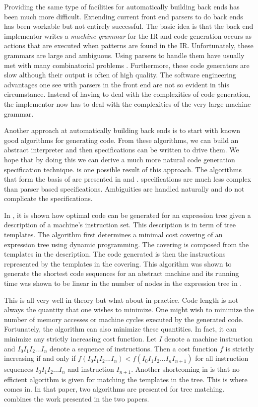 Providing the same type of facilities for automatically building back
ends has been much more difficult.  Extending current front end
parsers to do back ends
has been workable but not entirely successful.  The basic idea is that
the back end implementor writes a {\it machine grammar}
for the IR and code generation
occurs as actions that are executed when patterns are found
in the IR\cite{gana,henry}.
Unfortunately, these grammars are large and ambiguous.  Using
parsers to handle them have usually met with many combinatorial problems
\cite{henry}.  Furthermore, these code generators are slow
although their output is often of high quality.
The software engineering advantages one see with parsers in the front end
are not so evident in this circumstance.  Instead of having to deal with
the complexities of code generation, the implementor now has to deal with
the complexities of the very large machine grammar.

Another approach at automatically building back ends is to start with
known good algorithms for generating code.  From these algorithms, we
can build an abstract interpreter and then specifications can be written
to drive them.  We hope that by doing this we can derive a much more natural
code generation specification technique.
\Twiglang{} is one possible result of this approach.  The algorithms
that form the basis of \twiglang{} are presented in \cite{optimalcode} and
\cite{treematch}.  \Twiglang{}
specifications are much less complex than parser based
specifications.  Ambiguities are handled naturally and do not complicate
the specifications.

In \cite{optimalcode}, it is shown how optimal code can be generated
for an expression tree
given a description of a machine's instruction set.
This description is in term of tree templates.
The algorithm first determines a minimal cost covering of
an expression tree using dynamic programming.
The covering is composed from the templates in the
description.  The code generated is then the instructions
represented by the templates in the covering.
This algorithm was shown to generate the shortest code sequences for an
abstract machine and
its running time was shown to be linear in the number of nodes in the
expression tree in \cite{optimalcode}.

This is all very well in theory but what about in practice.
Code length is  not always the quantity that one wishes to minimize.
One might wish to minimize the number of memory accesses or machine cycles
executed by the generated code.
Fortunately, the algorithm can also minimize these quantities.
In fact, it can minimize any strictly increasing cost function.
Let $I$ denote a machine instruction and
$I_0I_1I_2...I_n$ denote a sequence of instructions.
Then a cost function $f$ is strictly increasing if and only if
$f(I_0I_1I_2...I_n) < f(I_0I_1I_2...I_nI_{n+1})$ for all
instruction sequences $I_0I_1I_2...I_n$ and instruction
$I_{n+1}$.  Another shortcoming in \cite{optimalcode}
is that no efficient algorithm is given for matching the templates
in the tree.  This is where \cite{treematch} comes in.  In that paper,
two algorithms are presented for tree matching.  \Twiglang{} combines
the work presented in the two papers.

